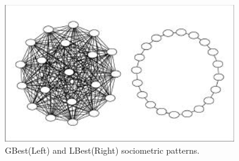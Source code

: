 \documentclass[oneside,12pt]{book}
\begin{document}
\begin{figure}[H]
    \centering
    \includegraphics[scale=1.0]{Images/NeighborhoodTopology.png}
    \caption{GBest(Left) and LBest(Right) sociometric patterns.\protect\cite{kennedy2002population}}
    \label{fig:GBest(Left) and LBest(Right) sociometric patterns.}
\end{figure}
\end{document}
